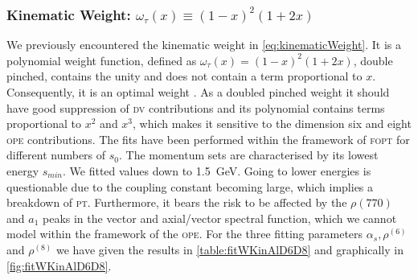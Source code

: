 \documentclass[../../index.tex]{subfiles}
\begin{document}
\subsubsection{Kinematic Weight: \(\omega_{\tau}(x) \equiv (1-x)^2(1+2x)\)}
We previously encountered the kinematic weight in \cref{eq:kinematicWeight}. It
is a polynomial weight function, defined as \(\omega_\tau(x) = (1-x)^2(1+2x)\),
double pinched, contains the unity and does not contain a term proportional to
\(x\). Consequently, it is an optimal weight \cite{Beneke2012}. As a doubled
pinched weight it should have good suppression of \textsc{dv} contributions and
its polynomial contains terms proportional to \(x^2\) and \(x^3\), which makes
it sensitive to the dimension six and eight \textsc{ope} contributions. The fits
have been performed within the framework of \textsc{fopt} for different numbers
of \(s_0\). The momentum sets are characterised by its lowest energy
\(s_{min}\). We fitted values down to \SI{1.5}{\giga\eV}. Going to lower
energies is questionable due to the coupling constant becoming large, which
implies a breakdown of \textsc{pt}. Furthermore, it bears the risk to be
affected by the \(\rho(770)\) and \(a_1\) peaks in the vector and axial\-/vector
spectral function, which we cannot model within the framework of the
\textsc{ope}. For the three fitting parameters \(\alpha_s, \rho^{(6)}\) and
\(\rho^{(8)}\) we have given the results in \cref{table:fitWKinAlD6D8} and
graphically in \cref{fig:fitWKinAlD6D8}.
\end{document}
